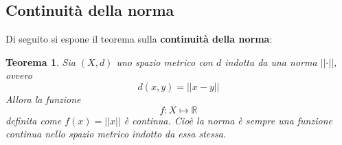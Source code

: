 \documentclass[a4paper]{extarticle}
\newtheorem{theorem}{Teorema}[section]
\begin{document}
\vspace{1em}
\noindent
\subsection{Continuità della norma}
Di seguito si espone il teorema sulla \textbf{continuità della norma}:

\begin{theorem}
    Sia $(X,d)$ uno spazio metrico con $d$ indotta da una norma $\left \vert \left \vert \cdot \right \vert \right \vert$, ovvero
    \[d(x,y)=\left \vert \left \vert x-y \right \vert \right \vert\] Allora la funzione
    \[f : X \longmapsto \mathbb{R}\]
    definita come $f(x) = \left \vert \left \vert x \right \vert \right \vert$ è continua. Cioè la norma è sempre una funzione continua nello spazio metrico indotto da essa stessa.
\end{theorem}
\end{document}
